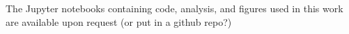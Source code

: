 \documentclass[fleqn,usenatbib]{rasti}
\begin{document}
 
The Jupyter notebooks containing code, analysis, and figures used in this work are available upon request (or put in a github repo?) 







\bsp	%
\label{lastpage}
\end{document}
